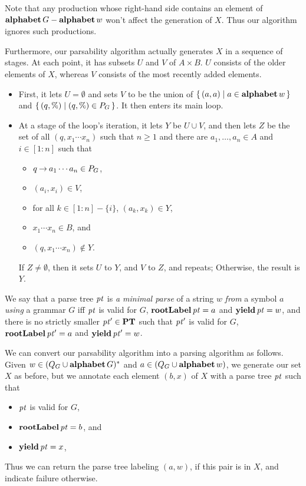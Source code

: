 Note that any production whose right-hand side contains an element of
$\mathbf{alphabet}\,G-\mathbf{alphabet}\,w$ won't affect the generation of $X$.  Thus
our algorithm ignores such productions.

Furthermore, our parsability algorithm actually generates $X$ in a
sequence of stages. At each point, it has subsets $U$ and $V$ of
$A\times B$. $U$ consists of the older elements of $X$, whereas $V$
consists of the most recently added elements.
\begin{itemize}
\item First, it lets $U=\emptyset$ and sets $V$ to be the union of
  $\{ \, (a,a) \mid a\in\mathbf{alphabet}\,w \, \}$ and $\{ \, (q,\%) \mid (q,\%)\in
    P_G \, \}$. It then enters its main loop.

\item At a stage of the loop's iteration, it lets $Y$ be $U\cup V$,
  and then lets $Z$ be the set of all $(q,x_1\cdots x_n)$ such that
  $n\geq 1$ and there are $a_1,\ldots,a_n\in A$ and $i\in[1:n]$ such
  that
  \begin{itemize}
  \item $q\mathbin{\to} a_1\cdots a_n\in P_G$,

  \item $(a_i,x_i)\in V$,

  \item for all $k\in[1:n]-\{i\}$, $(a_k,x_k)\in Y$,

  \item $x_1\cdots x_n\in B$, and

  \item $(q,x_1\cdots x_n)\not\in Y$.
  \end{itemize}
  If $Z\neq\emptyset$, then it sets $U$ to $Y$, and $V$ to $Z$, and
  repeats; Otherwise, the result is $Y$.
\end{itemize}

We say that a parse tree ${\it pt}$ is \emph{a minimal parse} of a string
$w$ \emph{from} a symbol $a$ \emph{using} a grammar $G$ iff ${\it pt}$ is
valid for $G$, $\mathbf{rootLabel}\,{\it pt} = a$ and $\mathbf{yield}\,{\it pt} = w$, and there
is no strictly smaller ${\it pt}'\in\mathbf{PT}$ such that ${\it pt}'$ is valid for $G$,
$\mathbf{rootLabel}\,{\it pt}' = a$ and $\mathbf{yield}\,{\it pt}' = w$.

We can convert our parsability algorithm into a parsing algorithm as
follows.  Given $w\in(Q_G\cup\mathbf{alphabet}\,G)^*$ and
$a\in(Q_G\cup\mathbf{alphabet}\,w)$, we generate our set $X$ as before, but we
annotate each element $(b,x)$ of $X$ with a parse tree ${\it pt}$ such that
\begin{itemize}
\item ${\it pt}$ is valid for $G$,

\item $\mathbf{rootLabel}\,{\it pt}=b$, and

\item $\mathbf{yield}\,{\it pt}=x$,
\end{itemize}
Thus we can return the parse tree labeling $(a, w)$, if this pair is
in $X$, and indicate failure otherwise.

